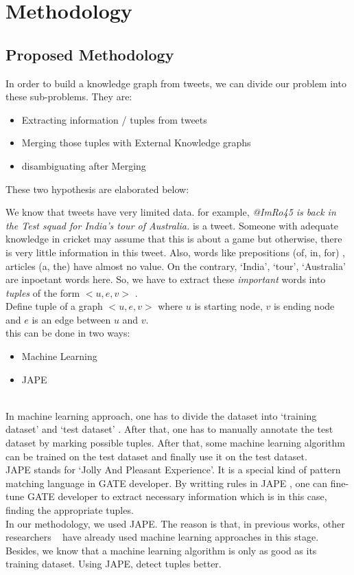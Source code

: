 \chapter{Methodology}\label{ch4}

\section{Proposed Methodology}
In order to build a knowledge graph from tweets, we can divide our problem into these sub-problems. They are:
\begin{itemize}
\item Extracting information / tuples from tweets 
\item Merging those tuples with External Knowledge graphs
\item disambiguating after Merging 
\end{itemize} 
These two hypothesis are elaborated below: 

We know that tweets have very limited data. for example, 
\textit{ @ImRo45 is back in the Test squad for India’s tour of Australia. } is a tweet. Someone with adequate knowledge in cricket
may assume that this is about a game but otherwise, there is very little information in this tweet. 
Also, words like prepositions (of, in, for) , articles (a, the) have almost no value. On the contrary, `India', `tour', `Australia' 
are inpoetant words here. 
So, we have to extract these \textit{ important } words into \textit{ tuples } of the form $<u, e, v>$ . \\
 Define tuple of a graph $<u, e, v>$ where $ u $ is starting node, $ v $ is ending node and $ e $ is an edge between $ u $ and $v $. \\

this can be done in two ways: 
\begin{itemize}
\item Machine Learning 
\item JAPE 
\end{itemize} 
\\
In machine learning approach, one has to divide the dataset into `training dataset'  and `test dataset' . 
After that, one has to manually annotate the test dataset by marking possible tuples. After that, some machine learning algorithm
 can be trained on the test dataset and finally use it on the test dataset. 
\\ 
JAPE stands for `Jolly And Pleasant Experience'. It is a special kind of pattern matching language in GATE developer. 
By writting rules in JAPE , one can fine-tune GATE developer to extract necessary information which is in this case, 
finding the appropriate tuples. 
\\ 
In our methodology, we used JAPE. The reason is that, in previous works, other researchers  
~\cite{ref1DeepLearning} have already used machine learning approaches in this stage. Besides, we know 
that a machine learning algorithm is only as good as its training dataset. Using JAPE, detect tuples 
better.   


